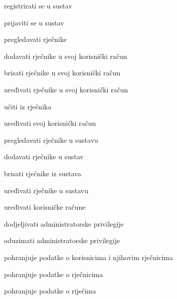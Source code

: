 			
			\begin{packed_enum}
				\item  {}
				
				\begin{packed_enum}
					\item registrirati se u sustav
					\item prijaviti se u sustav
				\end{packed_enum}

				
			
				\item  {}
				
				\begin{packed_enum}
					\item pregledavati rječnike
					\item dodavati rječnike u svoj korisnički račun
					\item brisati rječnike u svoj korisnički račun
					\item uređivati rječnike u svoj korisnički račun
					\item učiti iz rječnika
					\item uređivati svoj korisnički račun
					
				\end{packed_enum}

				\item {}
				\begin{packed_enum}
					\item pregledavati rječnike u sustavu
					\item dodavati rječnike u sustav
					\item brisati rječnike iz sustava
					\item uređivati rječnike u sustavu
					\item uređivati korisničke račune
					\item dodjeljivati administratorske privilegije
					\item oduzimati administratorske privilegije
				\end{packed_enum}

				\pagebreak

				\item {}
				\begin{packed_enum}
					\item pohranjuje podatke o korisnicima i njihovim rječnicima
					\item pohranjuje podatke o rječnicima
					\item pohranjuje podatke o riječima
				\end{packed_enum}

			\end{packed_enum}
			
